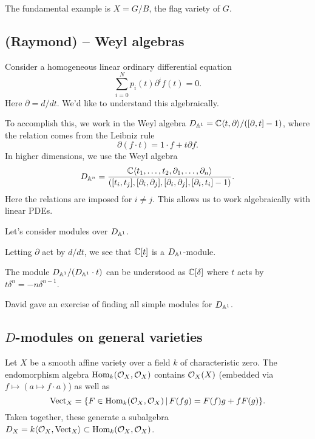 \documentclass{article}
\begin{document}
\begin{ex}
	The fundamental example is $X = G / B$, the flag variety of $G$.
\end{ex}

\subsection{(Raymond) -- Weyl algebras}

Consider a homogeneous linear ordinary differential equation
\[
	\sum_{i=0}^N p_i(t) \partial^i f(t) = 0.
\]
Here $\partial = d/dt$.
We'd like to understand this algebraically.

To accomplish this, we work in the Weyl algebra $D_{\AA^1} = \CC\langle t, \partial \rangle / ([\partial, t] - 1)$, where the relation comes from the Leibniz rule
\[
	\partial (f \cdot t) = 1 \cdot f + t \partial f.
\]
In higher dimensions, we use the Weyl algebra
\[
	D_{\AA^n} = \frac{\CC\langle t_1, \dots, t_2, \partial_1, \dots, \partial_n \rangle}{([t_i, t_j], [\partial_i, \partial_j], [\partial_i, \partial_j], [\partial_i, t_i] - 1)}.
\]
Here the relations are imposed for $i \neq j$.
This allows us to work algebraically with linear PDEs.

Let's consider modules over $D_{\AA^1}$.

\begin{ex}
	Letting $\partial$ act by $d / dt$, we see that $\CC[t]$ is a $D_{\AA^1}$-module.
\end{ex}

\begin{ex}
	The module $D_{\AA^1} / (D_{\AA^1} \cdot t)$ can be understood as $\CC[\delta]$ where $t$ acts by $t \delta^n = -n \delta^{n-1}$.
\end{ex}

David gave an exercise of finding all simple modules for $D_{\AA^1}$.

\subsection{$D$-modules on general varieties}

Let $X$ be a smooth affine variety over a field $k$ of characteristic zero.
The endomorphism algebra $\Hom_k(\Oc_X, \Oc_X)$ contains $\Oc_X(X)$ (embedded via $f \mapsto (a \mapsto f \cdot a)$) as well as 
\[
	\Vectrm_X = \{ F \in \Hom_k(\Oc_X, \Oc_X) \,|\, F(fg) = F(f)g + f F(g) \}.
\]
Taken together, these generate a subalgebra $D_X = k\langle \Oc_X, \Vectrm_X\rangle \subset \Hom_k(\Oc_X, \Oc_X)$.
\end{document}
